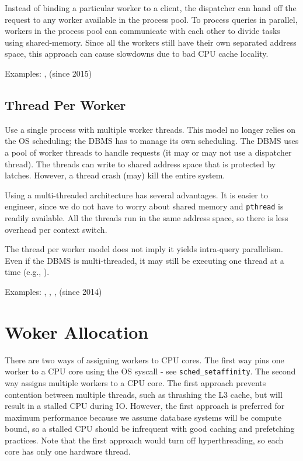 \documentclass[11pt]{article}
\begin{document}
Instead of binding a particular worker to a client, the dispatcher can hand off the request to any 
worker available in the process pool. To process queries in parallel, workers in the process pool 
can communicate with each other to divide tasks using shared-memory. Since all the workers still 
have their own separated address space, this approach can cause slowdowns due to bad CPU cache 
locality.

Examples: ,  (since 2015)

\subsection*{Thread Per Worker}
Use a single process with multiple worker threads. This model no longer relies on the OS scheduling; 
the DBMS has to manage its own scheduling. The DBMS uses a pool of worker threads to handle requests 
(it may or may not use a dispatcher thread). The threads can write to shared address space that is 
protected by latches. However, a thread crash (may) kill the entire system.

Using a multi-threaded architecture has several advantages. It is easier to engineer, since we do 
not have to worry about shared memory and \texttt{pthread} is readily available. All the threads run 
in the same address space, so there is less overhead per context switch.


The thread per worker model does not imply it yields intra-query parallelism. Even if the DBMS is 
multi-threaded, it may still be executing one thread at a time (e.g., ).

Examples: , , ,  (since 2014)

\section{Woker Allocation}
There are two ways of assigning workers to CPU cores. The first way pins one worker to a CPU core using the 
OS syscall - see \texttt{sched\_setaffinity}. The second way assigns multiple workers to a CPU
core. The first approach prevents contention between multiple threads, such as thrashing the L3 cache, 
but will result in a stalled CPU during IO. However, the first approach is preferred for maximum performance
because we assume database systems will be compute bound, so a stalled CPU should be infrequent with
good caching and prefetching practices. Note that the first approach would turn off hyperthreading, so each core
has only one hardware thread.
\end{document}
